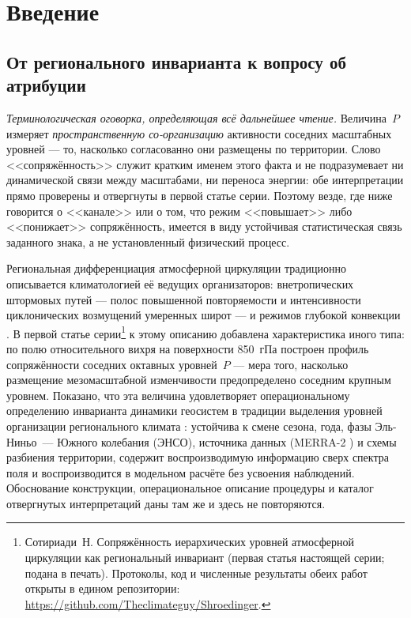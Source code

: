 \documentclass[11pt,a4paper]{article}
\begin{document}
\section{Введение}
\label{sec:intro}

\subsection{От регионального инварианта к вопросу об атрибуции}

\emph{Терминологическая оговорка, определяющая всё дальнейшее чтение.} Величина~$P$ измеряет \emph{пространственную со-организацию} активности соседних масштабных уровней --- то, насколько согласованно они размещены по территории. Слово <<сопряжённость>> служит кратким именем этого факта и не подразумевает ни динамической связи между масштабами, ни переноса энергии: обе интерпретации прямо проверены и отвергнуты в первой статье серии. Поэтому везде, где ниже говорится о <<канале>> или о том, что режим <<повышает>> либо <<понижает>> сопряжённость, имеется в виду устойчивая статистическая связь заданного знака, а не установленный физический процесс.

Региональная дифференциация атмосферной циркуляции традиционно описывается климатологией её ведущих организаторов: внетропических штормовых путей --- полос повышенной повторяемости и интенсивности циклонических возмущений умеренных широт \cite{HoskinsValdes1990,Chang2002,HoskinsHodges2005,Shaw2016} --- и режимов глубокой конвекции \cite{Houze2004,Feng2021}. В первой статье серии\footnote{Сотириади~Н. Сопряжённость иерархических уровней атмосферной циркуляции как региональный инвариант (первая статья настоящей серии; подана в печать). Протоколы, код и численные результаты обеих работ открыты в едином репозитории: \url{https://github.com/Theclimateguy/Shroedinger}.} к этому описанию добавлена характеристика иного типа: по полю относительного вихря на поверхности 850~гПа построен профиль сопряжённости соседних октавных уровней~$P$ --- мера того, насколько размещение мезомасштабной изменчивости предопределено соседним крупным уровнем. Показано, что эта величина удовлетворяет операциональному определению инварианта динамики геосистем \cite{Puzachenko1986,Puzachenko2004,Puzachenko2010} в традиции выделения уровней организации регионального климата \cite{Krenke2019}: устойчива к смене сезона, года, фазы Эль-Ниньо~--- Южного колебания (ЭНСО), источника данных (MERRA-2 \cite{Gelaro2017}) и схемы разбиения территории, содержит воспроизводимую информацию сверх спектра поля и воспроизводится в модельном расчёте без усвоения наблюдений. Обоснование конструкции, операциональное описание процедуры и каталог отвергнутых интерпретаций даны там же и здесь не повторяются.
\end{document}
